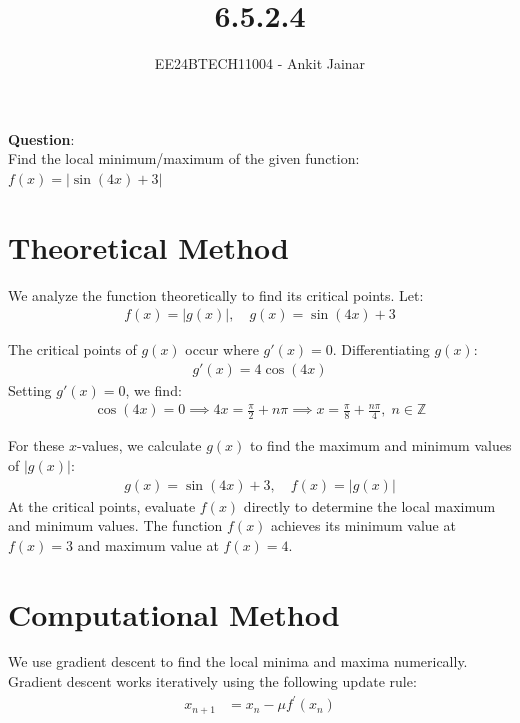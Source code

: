 \documentclass[journal]{IEEEtran}
\begin{document}

\vspace{3cm}

\title{6.5.2.4}
\author{EE24BTECH11004 - Ankit Jainar}
\maketitle

\renewcommand{\thefigure}{\theenumi}
\renewcommand{\thetable}{\theenumi}
\setlength{\intextsep}{10pt}

\renewcommand{\thetable}{\theenumi}

\textbf{Question}:\\
Find the local minimum/maximum of the given function:\\
$f(x) = |\sin(4x) + 3|$
\\

\section*{Theoretical Method}
We analyze the function theoretically to find its critical points. Let:
\begin{align}
    f(x) = |g(x)|, \quad g(x) = \sin(4x) + 3
\end{align}

The critical points of \(g(x)\) occur where \(g'(x) = 0\). Differentiating \(g(x)\):
\begin{align}
    g'(x) = 4\cos(4x)
\end{align}
Setting \(g'(x) = 0\), we find:
\begin{align}
    \cos(4x) = 0 \implies 4x = \frac{\pi}{2} + n\pi \implies x = \frac{\pi}{8} + \frac{n\pi}{4}, \; n \in \mathbb{Z}
\end{align}

For these \(x\)-values, we calculate \(g(x)\) to find the maximum and minimum values of \(|g(x)|\):
\begin{align}
    g(x) = \sin(4x) + 3, \quad f(x) = |g(x)|
\end{align}
At the critical points, evaluate \(f(x)\) directly to determine the local maximum and minimum values. The function \(f(x)\) achieves its minimum value at \(f(x) = 3\) and maximum value at \(f(x) = 4\).

\section*{Computational Method}
We use gradient descent to find the local minima and maxima numerically. Gradient descent works iteratively using the following update rule:
\begin{align}
    x_{n+1} &= x_n - \mu f^{\prime}(x_n)
\end{align}
\end{document}

